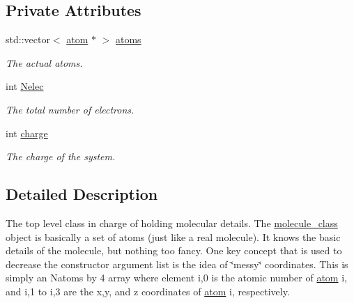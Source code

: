 \subsection*{Private Attributes}
\begin{DoxyCompactItemize}
\item 
std::vector$<$ \hyperlink{classJKBuilder_1_1atom}{atom} $\ast$ $>$ \hyperlink{classJKBuilder_1_1molecule__class_a88ab0e266efe1ae93e6005501b372c76}{atoms}
\begin{DoxyCompactList}\small\item\em The actual atoms. \item\end{DoxyCompactList}\item 
int \hyperlink{classJKBuilder_1_1molecule__class_a849e4a1d5fee0c024e42b658d3babd02}{Nelec}
\begin{DoxyCompactList}\small\item\em The total number of electrons. \item\end{DoxyCompactList}\item 
int \hyperlink{classJKBuilder_1_1molecule__class_ae8b866d74c9f0b8464b1aee9788c04eb}{charge}
\begin{DoxyCompactList}\small\item\em The charge of the system. \item\end{DoxyCompactList}\end{DoxyCompactItemize}


\subsection{Detailed Description}
The top level class in charge of holding molecular details. The \hyperlink{classJKBuilder_1_1molecule__class}{molecule\_\-class} object is basically a set of atoms (just like a real molecule). It knows the basic details of the molecule, but nothing too fancy. One key concept that is used to decrease the constructor argument list is the idea of \char`\"{}messy\char`\"{} coordinates. This is simply an Natoms by 4 array where element i,0 is the atomic number of \hyperlink{classJKBuilder_1_1atom}{atom} i, and i,1 to i,3 are the x,y, and z coordinates of \hyperlink{classJKBuilder_1_1atom}{atom} i, respectively. 


